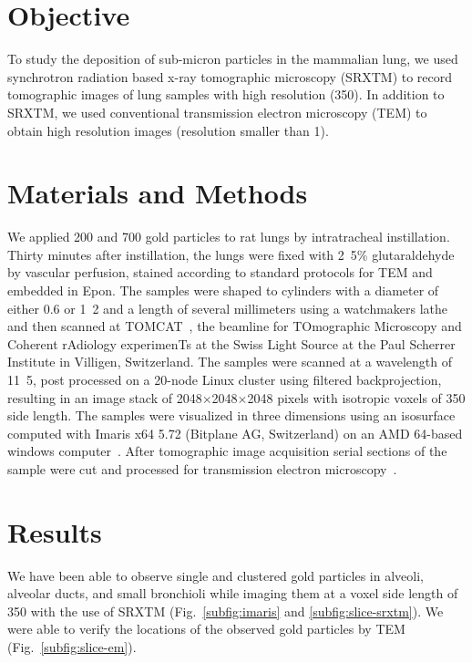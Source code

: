 \section{Objective}
To study the deposition of sub-micron particles in the mammalian lung, we used synchrotron radiation based x-ray tomographic microscopy (SRXTM) to record tomographic images of lung samples with high resolution (\unit{350}{\nano\meter}). In addition to SRXTM, we used conventional transmission electron microscopy (TEM) to obtain high resolution images (resolution smaller than \unit{1}{\nano\meter}).

\section{Materials and Methods}
We applied \unit{200}{\nano\meter} and \unit{700}{\nano\meter} gold particles to rat lungs by intratracheal instillation. Thirty minutes after instillation, the lungs were fixed with \unit{2.5}{\%} glutaraldehyde by vascular perfusion, stained according to standard protocols for TEM and embedded in Epon. The samples were shaped to cylinders with a diameter of either 0.6 or \unit{1.2}{\milli\meter} and a length of several millimeters using a watchmakers lathe and then scanned at TOMCAT~\cite{Stampanoni2007}, the beamline for TOmographic Microscopy and Coherent rAdiology experimenTs at the Swiss Light Source at the Paul Scherrer Institute in Villigen, Switzerland. The samples were scanned at a wavelength of \unit{11.5}{\kilo\electronvolt}, post processed on a 20-node Linux cluster using filtered backprojection, resulting in an image stack of 2048$\times$2048$\times$2048 pixels with isotropic voxels of \unit{350}{\nano\meter} side length. The samples were visualized in three dimensions using an isosurface computed with Imaris x64 5.72 (Bitplane AG, Switzerland) on an AMD 64-based windows computer~\cite{Tsuda2008}. After tomographic image acquisition serial sections of the sample were cut and processed for transmission electron microscopy~\cite{Mund2008}. 

\section{Results}
We have been able to observe single and clustered gold particles in alveoli, alveolar ducts, and small bronchioli while imaging them at a voxel side length of \unit{350}{\nano\meter} with the use of SRXTM (Fig.~\ref{subfig:imaris} and \ref{subfig:slice-srxtm}). We were able to verify the locations of the observed gold particles by TEM (Fig.~\ref{subfig:slice-em}). 


